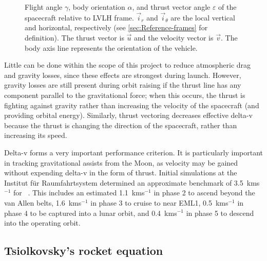 \begin{figure}
\centering
\def\svgwidth{0.4\textwidth}

\caption{Flight angle $\gamma$, body orientation $\alpha$, and thrust vector angle $\varepsilon$ of the spacecraft relative to LVLH frame. $\vec{i}_r$ and $\vec{i}_\theta$ are the local vertical and horizontal, respectively (see \autoref{sec:Reference-frames} for definition). The thrust vector is $\vec{u}$ and the velocity vector is $\vec{v}$. The body axis line represents the orientation of the vehicle.} 
\label{fig:path-angles}
\end{figure}

Little can be done within the scope of this project to reduce atmospheric drag and gravity losses, since these effects are strongest during launch. However, gravity losses are still present during orbit raising if the thrust line has any component parallel to the gravitational force; when this occurs, the thrust is fighting against gravity rather than increasing the velocity of the spacecraft (and providing orbital energy). Similarly, thrust vectoring decreases effective delta-v because the thrust is changing the direction of the spacecraft, rather than increasing its speed. 
 
Delta-v forms a very important performance criterion. It is particularly important in tracking gravitational assists from the Moon, as velocity may be gained without expending delta-v in the form of thrust. Initial simulations at the Institut f\"{u}r Raumfahrtsystem determined an approximate benchmark of 3.5~kms$^{-1}$ for \BW\ \parencite{Roeser2006}. This includes an estimated 1.1~kms$^{-1}$ in phase 2 to ascend beyond the van Allen belts, 1.6~kms$^{-1}$ in phase 3 to cruise to near EML1, 0.5~kms$^{-1}$ in phase 4 to be captured into a lunar orbit, and 0.4~kms$^{-1}$ in phase 5 to descend into the operating orbit.

\subsection{Tsiolkovsky's rocket equation} \label{sec:Tsiolkovsky}

